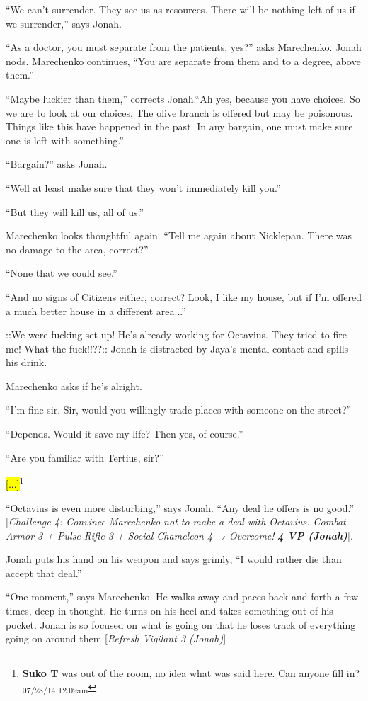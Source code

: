``We can't surrender.  They see us as resources.  There will be nothing left of us if we surrender,'' says Jonah.

``As a doctor, you must separate from the patients, yes?'' asks Marechenko.  Jonah nods.  Marechenko continues, ``You are separate from them and to a degree, above them.''

``Maybe luckier than them,'' corrects Jonah.``Ah yes, because you have choices.  So we are to look at our choices.  The olive branch is offered but may be poisonous.  Things like this have happened in the past.  In any bargain, one must make sure one is left with something.''

``Bargain?'' asks Jonah.

``Well at least make sure that they won't immediately kill you.''

``But they will kill us, all of us.''

Marechenko looks thoughtful again.  ``Tell me again about Nicklepan. There was no damage to the area, correct?''

``None that we could see.''

``And no signs of Citizens either, correct?   Look, I like my house, but if I'm offered a much better house in a different area...''

 {\color[RGB]{255,0,0}::We were fucking set up!  He's already working for Octavius.  They tried to fire me!  What the fuck!!??::  } Jonah is distracted by Jaya's mental contact and spills his drink.

Marechenko asks if he's alright.

``I'm fine sir.  Sir, would you willingly trade places with someone on the street?''

``Depends.  Would it save my life?  Then yes, of course.''

``Are you familiar with Tertius, sir?''

\hl{{[}...{]}}\footnote{\textbf{Suko T }was out of the room, no idea what was said here.  Can anyone fill in? \textsubscript{07/28/14 12:09am}}

``Octavius is even more disturbing,'' says Jonah.  ``Any deal he offers is no good.'' {[}\textit{Challenge 4: Convince Marechenko not to make a deal with Octavius.  Combat Armor 3 + Pulse Rifle 3 + Social Chameleon 4 → Overcome! }\textit{\textbf{4 VP (Jonah)}}{]}.  

Jonah puts his hand on his weapon and says grimly, ``I would rather die than accept that deal.''

``One moment,'' says Marechenko. He walks away and paces back and forth a few times, deep in thought.  He turns on his heel and takes something out of his pocket.  Jonah is so focused on what is going on that he loses track of everything going on around them {[}\textit{Refresh Vigilant 3 (Jonah)}{]}

